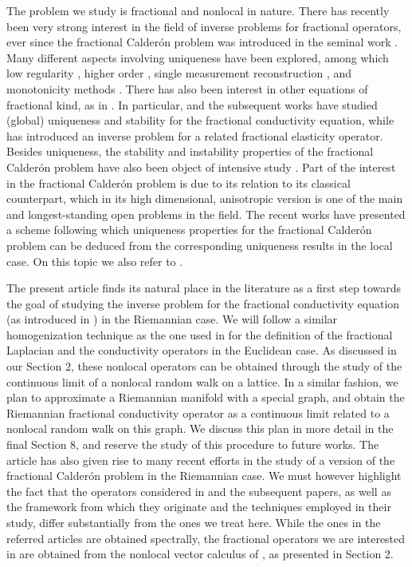 \documentclass[a4paper,11pt,oneside]{amsart}
\begin{document}
The problem we study is fractional and nonlocal in nature. There has recently been very strong interest in the field of inverse problems for fractional operators, ever since the fractional Calder\'on problem was introduced in the seminal work \cite{GSU20}. Many different aspects involving uniqueness have been explored, among which low regularity \cite{RS20}, higher order \cite{CMRU22}, single measurement reconstruction \cite{GRSU20}, and monotonicity methods \cite{HL20, HL20a}. There has also been interest in other equations of fractional kind, as in \cite{RS20a,LLR20,CLR20,BGU21,L21,L23}. In particular, \cite{C20} and the subsequent works \cite{C20a,C22,CRZ22,CRTZ24} have studied (global) uniqueness and stability for the fractional conductivity equation, while \cite{CdHS22} has introduced an inverse problem for a related fractional elasticity operator. Besides uniqueness, the stability and instability properties of the fractional Calder\'on problem have also been object of intensive study \cite{RS18,R21,KRS21,BCR24}. Part of the interest in the fractional Calder\'on problem is due to its relation to its classical counterpart, which in its high dimensional, anisotropic version is one of the main and longest-standing open problems in the field. The recent works \cite{GU21, CGRU23} have presented a scheme following which uniqueness properties for the fractional Calder\'on problem can be deduced from the corresponding uniqueness results in the local case. On this topic we also refer to \cite{LLU23,Lin23}. 

The present article finds its natural place in the literature as a first step towards the goal of studying the inverse problem for the fractional conductivity equation (as introduced in \cite{C20}) in the Riemannian case. We will follow a similar homogenization technique as the one used in \cite{Val09,C20} for the definition of the fractional Laplacian and the conductivity operators in the Euclidean case. As discussed in our Section 2, these nonlocal operators can be obtained through the study of the continuous limit of a nonlocal random walk on a lattice. In a similar fashion, we plan to approximate a Riemannian manifold with a special graph, and obtain the Riemannian fractional conductivity operator as a continuous limit related to a nonlocal random walk on this graph. We discuss this plan in more detail in the final Section 8, and reserve the study of this procedure to future works. The article \cite{FGKU21} has also given rise to many recent efforts in the study of a version of the fractional Calder\'on problem in the Riemannian case. We must however highlight the fact that the operators considered in \cite{FGKU21} and the subsequent papers, as well as the framework from which they originate and the techniques employed in their study, differ substantially from the ones we treat here. While the ones in the referred articles are obtained spectrally, the fractional operators we are interested in are obtained from the nonlocal vector calculus of \cite{DGLZ12, DGLZ13}, as presented in Section 2.\\
\end{document}
